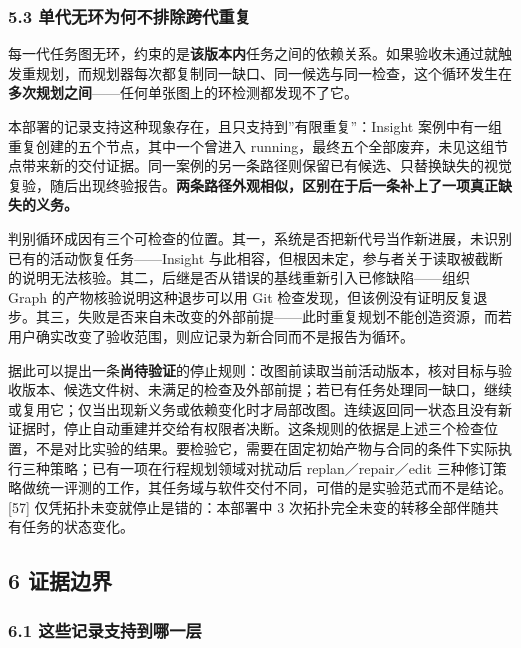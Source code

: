 \documentclass[
]{article}
\begin{document}
\subsubsection{5.3
单代无环为何不排除跨代重复}\label{ux5355ux4ee3ux65e0ux73afux4e3aux4f55ux4e0dux6392ux9664ux8de8ux4ee3ux91cdux590d}

每一代任务图无环，约束的是\textbf{该版本内}任务之间的依赖关系。如果验收未通过就触发重规划，而规划器每次都复制同一缺口、同一候选与同一检查，这个循环发生在\textbf{多次规划之间}------任何单张图上的环检测都发现不了它。

本部署的记录支持这种现象存在，且只支持到''有限重复''：Insight
案例中有一组重复创建的五个节点，其中一个曾进入
running，最终五个全部废弃，未见这组节点带来新的交付证据。同一案例的另一条路径则保留已有候选、只替换缺失的视觉复验，随后出现终验报告。\textbf{两条路径外观相似，区别在于后一条补上了一项真正缺失的义务。}

判别循环成因有三个可检查的位置。其一，系统是否把新代号当作新进展，未识别已有的活动恢复任务------Insight
与此相容，但根因未定，参与者关于读取被截断的说明无法核验。其二，后继是否从错误的基线重新引入已修缺陷------组织
Graph 的产物核验说明这种退步可以用 Git
检查发现，但该例没有证明反复退步。其三，失败是否来自未改变的外部前提------此时重复规划不能创造资源，而若用户确实改变了验收范围，则应记录为新合同而不是报告为循环。

据此可以提出一条\textbf{尚待验证}的停止规则：改图前读取当前活动版本，核对目标与验收版本、候选文件树、未满足的检查及外部前提；若已有任务处理同一缺口，继续或复用它；仅当出现新义务或依赖变化时才局部改图。连续返回同一状态且没有新证据时，停止自动重建并交给有权限者决断。这条规则的依据是上述三个检查位置，不是对比实验的结果。要检验它，需要在固定初始产物与合同的条件下实际执行三种策略；已有一项在行程规划领域对扰动后
replan／repair／edit
三种修订策略做统一评测的工作，其任务域与软件交付不同，可借的是实验范式而不是结论。{[}57{]}
仅凭拓扑未变就停止是错的：本部署中 3
次拓扑完全未变的转移全部伴随共有任务的状态变化。

\subsection{6 证据边界}\label{ux8bc1ux636eux8fb9ux754c}

\subsubsection{6.1
这些记录支持到哪一层}\label{ux8fd9ux4e9bux8bb0ux5f55ux652fux6301ux5230ux54eaux4e00ux5c42}
\end{document}
